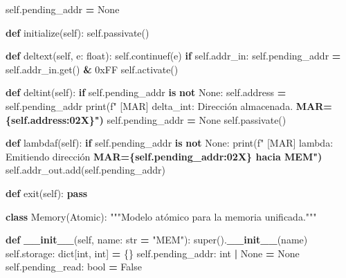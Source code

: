 \documentclass[12pt,oneside]{templates/unerthesis}
\newenvironment{Shaded}{\begin{snugshade}}{\end{snugshade}}
\newcommand{\BaseNTok}[1]{\textcolor[rgb]{0.00,0.00,0.81}{#1}}
\newcommand{\BuiltInTok}[1]{#1}
\newcommand{\ControlFlowTok}[1]{\textcolor[rgb]{0.13,0.29,0.53}{\textbf{#1}}}
\newcommand{\ErrorTok}[1]{\textcolor[rgb]{0.64,0.00,0.00}{\textbf{#1}}}
\newcommand{\FunctionTok}[1]{\textcolor[rgb]{0.13,0.29,0.53}{\textbf{#1}}}
\newcommand{\KeywordTok}[1]{\textcolor[rgb]{0.13,0.29,0.53}{\textbf{#1}}}
\newcommand{\NormalTok}[1]{#1}
\newcommand{\OperatorTok}[1]{\textcolor[rgb]{0.81,0.36,0.00}{\textbf{#1}}}
\newcommand{\SpecialStringTok}[1]{\textcolor[rgb]{0.31,0.60,0.02}{#1}}
\newcommand{\StringTok}[1]{\textcolor[rgb]{0.31,0.60,0.02}{#1}}
\newcommand{\VariableTok}[1]{\textcolor[rgb]{0.00,0.00,0.00}{#1}}
\begin{document}
\begin{Shaded}
\begin{Highlighting}[]
        \VariableTok{self}\NormalTok{.pending\_addr }\OperatorTok{=} \VariableTok{None}
    
    \KeywordTok{def}\NormalTok{ initialize(}\VariableTok{self}\NormalTok{):}
        \VariableTok{self}\NormalTok{.passivate()}
    
    \KeywordTok{def}\NormalTok{ deltext(}\VariableTok{self}\NormalTok{, e: }\BuiltInTok{float}\NormalTok{):}
        \VariableTok{self}\NormalTok{.continuef(e)}
        \ControlFlowTok{if} \VariableTok{self}\NormalTok{.addr\_in:}
            \VariableTok{self}\NormalTok{.pending\_addr }\OperatorTok{=} \VariableTok{self}\NormalTok{.addr\_in.get() }\OperatorTok{\&} \BaseNTok{0xFF}
            \VariableTok{self}\NormalTok{.activate()}
    
    \KeywordTok{def}\NormalTok{ deltint(}\VariableTok{self}\NormalTok{):}
        \ControlFlowTok{if} \VariableTok{self}\NormalTok{.pending\_addr }\KeywordTok{is} \KeywordTok{not} \VariableTok{None}\NormalTok{:}
            \VariableTok{self}\NormalTok{.address }\OperatorTok{=} \VariableTok{self}\NormalTok{.pending\_addr}
            \BuiltInTok{print}\NormalTok{(}\SpecialStringTok{f"  [MAR] delta\_int: Dirección almacenada. }
\ErrorTok{            MAR=\{self.address:02X\}")}
            \VariableTok{self}\NormalTok{.pending\_addr }\OperatorTok{=} \VariableTok{None}
        \VariableTok{self}\NormalTok{.passivate()}
    
    \KeywordTok{def}\NormalTok{ lambdaf(}\VariableTok{self}\NormalTok{):}
        \ControlFlowTok{if} \VariableTok{self}\NormalTok{.pending\_addr }\KeywordTok{is} \KeywordTok{not} \VariableTok{None}\NormalTok{:}
            \BuiltInTok{print}\NormalTok{(}\SpecialStringTok{f"  [MAR] lambda: Emitiendo dirección }
\ErrorTok{            MAR=\{self.pending\_addr:02X\} hacia MEM")}
            \VariableTok{self}\NormalTok{.addr\_out.add(}\VariableTok{self}\NormalTok{.pending\_addr)}
    
    \KeywordTok{def}\NormalTok{ exit(}\VariableTok{self}\NormalTok{):}
        \ControlFlowTok{pass}


\KeywordTok{class}\NormalTok{ Memory(Atomic):}
    \StringTok{"""Modelo atómico para la memoria unificada."""}
    
    \KeywordTok{def} \FunctionTok{\_\_init\_\_}\NormalTok{(}\VariableTok{self}\NormalTok{, name: }\BuiltInTok{str} \OperatorTok{=} \StringTok{"MEM"}\NormalTok{):}
        \BuiltInTok{super}\NormalTok{().}\FunctionTok{\_\_init\_\_}\NormalTok{(name)}
        \VariableTok{self}\NormalTok{.storage: }\BuiltInTok{dict}\NormalTok{[}\BuiltInTok{int}\NormalTok{, }\BuiltInTok{int}\NormalTok{] }\OperatorTok{=}\NormalTok{ \{\}}
        \VariableTok{self}\NormalTok{.pending\_addr: }\BuiltInTok{int} \OperatorTok{|} \VariableTok{None} \OperatorTok{=} \VariableTok{None}
        \VariableTok{self}\NormalTok{.pending\_read: }\BuiltInTok{bool} \OperatorTok{=} \VariableTok{False}
        

\end{Highlighting}
\end{Shaded}
\end{document}
